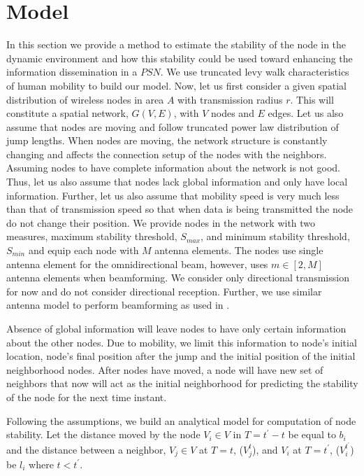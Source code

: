 \documentclass[preprint, twocolumn,5p]{elsarticle}
\begin{document}
\section{Model}\label{sec:model}
In this section we provide a method to estimate the stability of the node in the dynamic environment and how this stability could be used toward enhancing the information dissemination in a $PSN$. We use truncated levy walk characteristics of human mobility to build our model. Now, let us first consider a given spatial distribution of wireless nodes in area $A$ with transmission radius $r$. This will constitute a spatial network, $G(V,E)$, with $V$ nodes and $E$ edges. Let us also assume that nodes are moving and follow truncated power law distribution of jump lengths. When nodes are moving, the network structure is constantly changing and affects the connection setup of the nodes with the neighbors. Assuming nodes to have complete information about the network is not good. Thus, let us also assume that nodes lack global information and only have local information. Further, let us also assume that mobility speed is very much less than that of transmission speed so that when data is being transmitted the node do not change their position. We provide nodes in the network with two measures, maximum stability threshold, $S_{max}$, and minimum stability threshold, $S_{min}$ and equip each node with $M$ antenna elements. The nodes use single antenna element for the omnidirectional beam, however, uses $m\in[2,M]$ antenna elements when beamforming. We consider only directional transmission for now and do not consider directional reception. Further, we use similar antenna model to perform beamforming as used in \cite{Agarwal2012}.

Absence of global information will leave nodes to have only certain information about the other nodes. Due to mobility, we limit this information to node's initial location, node's final position after the jump and the initial position of the initial neighborhood nodes. After nodes have moved, a node will have new set of neighbors that now will act as the initial neighborhood for predicting the stability of the node for the next time instant.

Following the assumptions, we build an analytical model for computation of node stability. Let the distance moved by the node $V_{i}\in V$ in $T=t^{'}-t$ be equal to $b_{i}$ and the distance between a neighbor, $V_{j}\in V$ at $T=t$, ($V_{j}^{t}$), and $V_{i}$ at $T=t^{'}$, ($V_{i}^{t^{'}}$) be $l_{i}$ where $t<t^{'}$.
\end{document}
